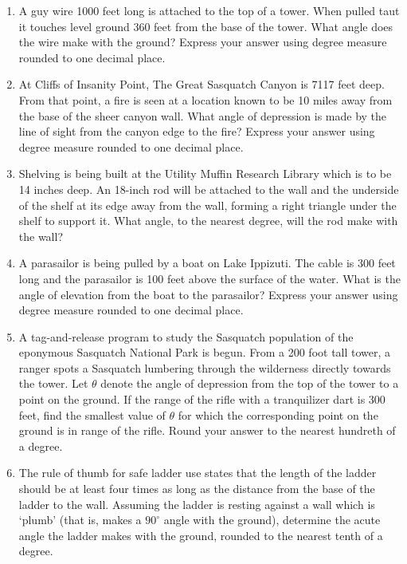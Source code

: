 \begin{enumerate}

\setcounter{enumi}{\value{HW}}

\item A guy wire 1000 feet long is attached to the top of a tower.  When pulled taut it touches level ground 360 feet from the base of the tower.  What angle does the wire make with the ground?  Express your answer using degree measure rounded to one decimal place.

\item At Cliffs of Insanity Point, The Great Sasquatch Canyon is 7117 feet deep.  From that point, a fire is seen at a location known to be 10 miles away from the base of the sheer canyon wall.  What angle of depression is made by the line of sight from the canyon edge to the fire?  Express your answer using degree measure rounded to one decimal place.

\item Shelving is being built at the Utility Muffin Research Library which is to be 14 inches deep.  An 18-inch rod will be attached to the wall and the underside of the shelf at its edge away from the wall, forming a right triangle under the shelf to support it.  What angle, to the nearest degree, will the rod make with the wall?

\item A parasailor is being pulled by a boat on Lake Ippizuti.  The cable is 300 feet long and the parasailor is 100 feet above the surface of the water.  What is the angle of elevation from the boat to the parasailor?  Express your answer using degree measure rounded to one decimal place.

\item  A tag-and-release program to study the Sasquatch population of the eponymous Sasquatch National Park is begun.  From a 200 foot tall tower, a ranger spots a Sasquatch lumbering through the wilderness directly towards the tower.  Let $\theta$ denote the angle of depression from the top of the tower to a point on the ground.  If the range of the rifle with a tranquilizer dart is 300 feet, find the smallest value of $\theta$ for which the corresponding point on the ground is in range of the rifle.  Round your answer to the nearest hundreth of a degree.

\item  The rule of thumb for safe ladder use states that the length of the ladder should be at least four times as long as the distance from the base of the ladder to the wall. Assuming the ladder is resting against a wall which is `plumb' (that is, makes a $90^{\circ}$ angle with the ground), determine the acute angle the ladder makes with the ground, rounded to the nearest tenth of a degree.

\setcounter{HW}{\value{enumi}}

\end{enumerate}

